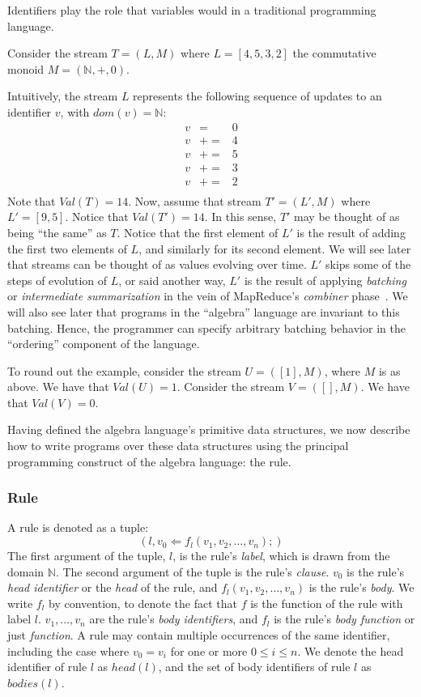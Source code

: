 Identifiers play the role that variables would in a traditional programming language.

\begin{example}
Consider the stream $T = (L,M)$ where $L = [4, 5, 3, 2]$ the commutative monoid $M = (\mathbb{N}, +, 0)$.

Intuitively, the stream $L$ represents the following sequence of updates to an identifier $v$, with $dom(v) = \mathbb{N}$:
\begin{eqnarray*}
v &=& 0\\
v &+=& 4\\
v &+=& 5\\
v &+=& 3\\
v &+=& 2\\
\end{eqnarray*}
Note that $Val(T) = 14$.  Now, assume that stream $T' = (L',M)$ where $L' = [9, 5]$.  Notice that $Val(T') = 14$.  In this sense, $T'$ may be thought of as being ``the same'' as $T$.  Notice that the first element of $L'$ is the result of adding the first two elements of $L$, and similarly for its second element.  We will see later that streams can be thought of as values evolving over time.  $L'$ skips some of the steps of evolution of $L$, or said another way, $L'$ is the result of applying {\em batching} or {\em intermediate summarization} in the vein of MapReduce's {\em combiner} phase~\cite{Dean2004}.  We will also see later that programs in the ``algebra'' language are invariant to this batching.  Hence, the programmer can specify arbitrary batching behavior in the ``ordering'' component of the language.

To round out the example, consider the stream $U = ([1], M)$, where $M$ is as above.  We have that $Val(U) = 1$.  Consider the stream $V = ([], M)$.  We have that $Val(V) = 0$.
\end{example}

Having defined the algebra language's primitive data structures, we now describe how to write programs over these data structures using the principal programming construct of the algebra language: the rule.

\subsubsection{Rule}

A rule is denoted as a tuple: $$(l, v_0 \Leftarrow f_l(v_1, v_2, \dots, v_n);)$$  The first argument of the tuple, $l$, is the rule's {\em label}, which is drawn from the domain $\mathbb{N}$.  The second argument of the tuple is the rule's {\em clause}. $v_0$ is the rule's {\em head identifier} or the {\em head} of the rule, and $f_l(v_1, v_2, \dots, v_n)$ is the rule's {\em body}.  We write $f_l$ by convention, to denote the fact that $f$ is the function of the rule with label $l$.  $v_1, \dots, v_n$ are the rule's {\em body identifiers}, and $f_l$ is the rule's {\em body function} or just {\em function}.  A rule may contain multiple occurrences of the same identifier, including the case where $v_0 = v_i$ for one or more $0 \leq i \leq n$.  We denote the head identifier of rule $l$ as $head(l)$, and the set of body identifiers of rule $l$ as $bodies(l)$.

